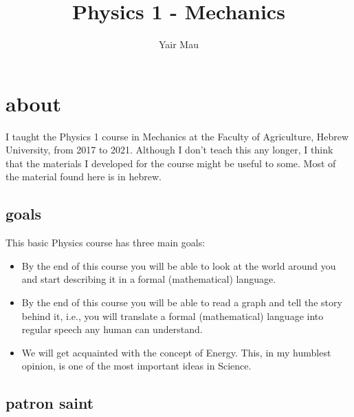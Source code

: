 \documentclass[
  letterpaper,
  DIV=11,
  numbers=noendperiod]{scrreprt}
\title{Physics 1 - Mechanics}
\author{Yair Mau}
\date{}
\providecommand{\tightlist}{%
  \setlength{\itemsep}{0pt}\setlength{\parskip}{0pt}}\usepackage{longtable,booktabs,array}
\renewcommand*\contentsname{Table of contents}
\newcommand\contentsname{Table of contents}
\begin{document}
\maketitle

\renewcommand*\contentsname{Table of contents}
{
\hypersetup{linkcolor=}
\setcounter{tocdepth}{2}
\tableofcontents
}


\chapter*{about}\label{about}


I taught the Physics 1 course in Mechanics at the Faculty of
Agriculture, Hebrew University, from 2017 to 2021. Although I don't
teach this any longer, I think that the materials I developed for the
course might be useful to some. Most of the material found here is in
hebrew.

\section*{goals}\label{goals}


This basic Physics course has three main goals:

\begin{itemize}
\tightlist
\item
  By the end of this course you will be able to look at the world around
  you and start describing it in a formal (mathematical) language.
\item
  By the end of this course you will be able to read a graph and tell
  the story behind it, i.e., you will translate a formal (mathematical)
  language into regular speech any human can understand.
\item
  We will get acquainted with the concept of Energy. This, in my
  humblest opinion, is one of the most important ideas in Science.
\end{itemize}

\section*{patron saint}\label{patron-saint}

\end{document}
